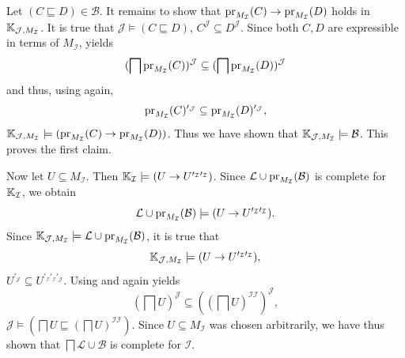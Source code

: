 \begin{Proof}
  Let $(C \sqsubseteq D) \in \mathcal{B}$.  It remains to show that
  $\operatorname{pr}_{M_{\mathcal{I}}}(C) \to \operatorname{pr}_{M_{\mathcal{I}}}(D)$ holds in ${\mathbb{K}}_{\mathcal{J},
    M_{\mathcal{I}}}$.  It is true that $\mathcal{J} \models (C \sqsubseteq D)$, \ie
  $C^{\mathcal{J}} \subseteq D^{\mathcal{J}}$.  Since both $C, D$ are expressible in terms
  of $M_{\mathcal{I}}$,  yields
  \begin{equation*}
    (\bigsqcap \operatorname{pr}_{M_{\mathcal{I}}}(C))^{\mathcal{J}} \subseteq (\bigsqcap
    \operatorname{pr}_{M_{\mathcal{I}}}(D))^{\mathcal{J}}
  \end{equation*}
  and thus, using  again,
  \begin{equation*}
    \operatorname{pr}_{M_{\mathcal{I}}}(C)^{\prime_{\mathcal{J}}} \subseteq \operatorname{pr}_{M_{\mathcal{I}}}(D)^{\prime_\mathcal{J}},
  \end{equation*}
  \ie ${\mathbb{K}}_{\mathcal{J}, M_{\mathcal{I}}} \models (\operatorname{pr}_{M_{\mathcal{I}}}(C) \to
  \operatorname{pr}_{M_{\mathcal{I}}}(D))$.  Thus we have shown that ${\mathbb{K}}_{\mathcal{J},
    M_{\mathcal{I}}} \models \mathcal{B}$.  This proves the first claim.

  Now let $U \subseteq M_{\mathcal{I}}$.  Then ${\mathbb{K}}_{\mathcal{I}} \models (U \to
  U^{\prime_{\mathcal{I}}\prime_{\mathcal{I}}})$.  Since $\mathcal{L} \cup
  \operatorname{pr}_{M_{\mathcal{I}}}(\mathcal{B})$ is complete for ${\mathbb{K}}_{\mathcal{I}}$, we obtain
  \begin{equation*}
    \mathcal{L} \cup \operatorname{pr}_{M_{\mathcal{I}}}(\mathcal{B}) \models (U \to
    U^{\prime_{\mathcal{I}}\prime_{\mathcal{I}}}).
  \end{equation*}
  Since ${\mathbb{K}}_{\mathcal{J}, M_{\mathcal{I}}} \models \mathcal{L} \cup
  \operatorname{pr}_{M_{\mathcal{I}}}(\mathcal{B})$, it is true that
  \begin{equation*}
    {\ensuremath{\mathbb{K}}}_{\mathcal{J}, M_{\mathcal{I}}} \models (U \to U^{\prime_{\mathcal{I}}\prime_{\mathcal{I}}}),
  \end{equation*}
  \ie $U^{\prime_{\mathcal{J}}} \subseteq
  U^{\prime_{\mathcal{I}}\prime_{\mathcal{I}}\prime_{\mathcal{J}}}$.  Using 
  and  again yields
  \begin{equation*}
    (\bigsqcap U)^{\mathcal{J}} \subseteq ((\bigsqcap U)^{\mathcal{I}\mathcal{I}})^{\mathcal{J}},
  \end{equation*}
  \ie $\mathcal{J} \models (\bigsqcap U \sqsubseteq (\bigsqcap
  U)^{\mathcal{I}\mathcal{I}})$.  Since $U \subseteq M_{\mathcal{I}}$ was chosen
  arbitrarily, we have thus shown that $\bigsqcap \mathcal{L} \cup \mathcal{B}$ is
  complete for $\mathcal{I}$.
\end{Proof}

